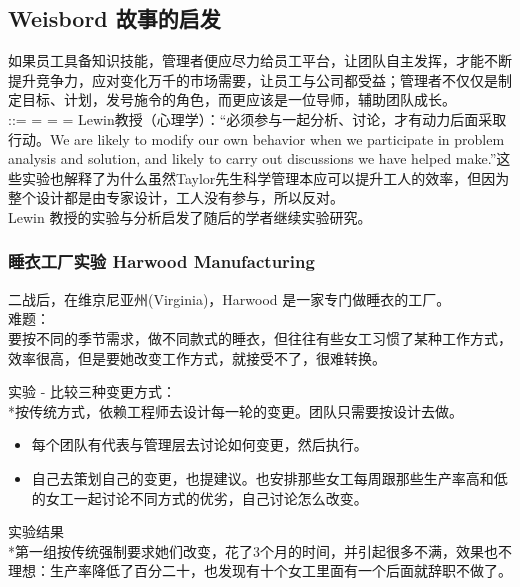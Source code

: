\hypertarget{weisbord-ux6545ux4e8bux7684ux542fux53d1}{%
\subsection{Weisbord
故事的启发}\label{weisbord-ux6545ux4e8bux7684ux542fux53d1}}

如果员工具备知识技能，管理者便应尽力给员工平台，让团队自主发挥，才能不断提升竞争力，应对变化万千的市场需要，让员工与公司都受益；管理者不仅仅是制定目标、计划，发号施令的角色，而更应该是一位导师，辅助团队成长。\\
::= = = =
Lewin教授（心理学）：``必须参与一起分析、讨论，才有动力后面采取行动。We
are likely to modify our own behavior when we participate in problem
analysis and solution, and likely to carry out discussions we have
helped
make.''这些实验也解释了为什么虽然Taylor先生科学管理本应可以提升工人的效率，但因为整个设计都是由专家设计，工人没有参与，所以反对。\\
Lewin 教授的实验与分析启发了随后的学者继续实验研究。

\hypertarget{ux7761ux8863ux5de5ux5382ux5b9eux9a8c-harwood-manufacturing}{%
\subsubsection{睡衣工厂实验 Harwood
Manufacturing}\label{ux7761ux8863ux5de5ux5382ux5b9eux9a8c-harwood-manufacturing}}

二战后，在维京尼亚州(Virginia)，Harwood 是一家专门做睡衣的工厂。\\
难题：\\
要按不同的季节需求，做不同款式的睡衣，但往往有些女工习惯了某种工作方式，效率很高，但是要她改变工作方式，就接受不了，很难转换。

实验 - 比较三种变更方式：\\
*按传统方式，依赖工程师去设计每一轮的变更。团队只需要按设计去做。

\begin{itemize}
\tightlist
\item
  每个团队有代表与管理层去讨论如何变更，然后执行。
\item
  自己去策划自己的变更，也提建议。也安排那些女工每周跟那些生产率高和低的女工一起讨论不同方式的优劣，自己讨论怎么改变。
\end{itemize}

实验结果\\
*第一组按传统强制要求她们改变，花了3个月的时间，并引起很多不满，效果也不理想：生产率降低了百分二十，也发现有十个女工里面有一个后面就辞职不做了。

